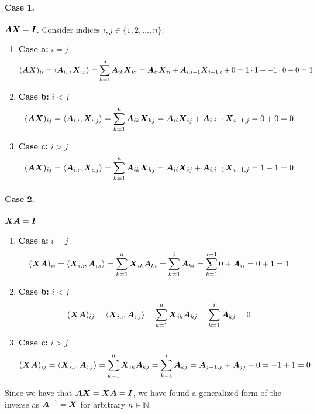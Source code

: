 \documentclass[]{exam}
\let\oldparagraph\paragraph
\renewcommand{\paragraph}[1]{\oldparagraph{#1}\mbox{}}
\begin{document}
\begin{questions}
\begin{enumerate}[label=\arabic*.]
		\paragraph{Case 1.} $\boldsymbol{A} \boldsymbol{X} = \boldsymbol{I}$. Consider indices $i, j \in \{1, 2, \ldots, n\}$:
		\begin{enumerate}[label=\alph*.]
			\item \textbf{Case a:} $i = j$
				\begin{gather*}
					(\boldsymbol{A} \boldsymbol{X})_{ii} = \langle \boldsymbol{A}_{i, :}, \boldsymbol{X}_{:, i} \rangle = \sum^n_{k = 1} \boldsymbol{A}_{ik} \boldsymbol{X}_{ki} = \boldsymbol{A}_{ii} \boldsymbol{X}_{ii} + \boldsymbol{A}_{i, i - 1} \boldsymbol{X}_{i - 1, i} + 0 = 1 \cdot 1 + -1 \cdot 0 + 0 = 1
				\end{gather*}
			\item \textbf{Case b:} $i < j$
				\begin{gather*}
					(\boldsymbol{A} \boldsymbol{X})_{ij} = \langle \boldsymbol{A}_{i, :}, \boldsymbol{X}_{:, j} \rangle = \sum^n_{k = 1} \boldsymbol{A}_{ik} \boldsymbol{X}_{kj} = \boldsymbol{A}_{ii} \boldsymbol{X}_{ij} + \boldsymbol{A}_{i,i - 1} \boldsymbol{X}_{i-1,j} = 0 + 0 = 0
				\end{gather*}
			\item \textbf{Case c:} $i > j$
				\begin{gather*}
					(\boldsymbol{A} \boldsymbol{X})_{ij} = \langle \boldsymbol{A}_{i, :}, \boldsymbol{X}_{:, j} \rangle = \sum^n_{k = 1} \boldsymbol{A}_{ik} \boldsymbol{X}_{kj} = \boldsymbol{A}_{ii} \boldsymbol{X}_{ij} + \boldsymbol{A}_{i,i - 1} \boldsymbol{X}_{i-1,j} = 1 - 1 = 0
				\end{gather*}
		\end{enumerate}
		\paragraph{Case 2.} $\boldsymbol{X} \boldsymbol{A} = \boldsymbol{I}$
		\begin{enumerate}[label=\alph*.]
			\item \textbf{Case a:} $i = j$
				\begin{gather*}
					(\boldsymbol{X} \boldsymbol{A})_{ii} = \langle \boldsymbol{X}_{i, :}, \boldsymbol{A}_{:, i} \rangle = \sum^n_{k = 1} \boldsymbol{X}_{ik} \boldsymbol{A}_{ki} = \sum^{i}_{k = 1} \boldsymbol{A}_{ki} = \sum^{i-1}_{k=1} 0 + \boldsymbol{A}_{ii} = 0 + 1 = 1
				\end{gather*}
			\item \textbf{Case b:} $i < j$
				\begin{gather*}
					(\boldsymbol{X} \boldsymbol{A})_{ij} = \langle \boldsymbol{X}_{i, :}, \boldsymbol{A}_{:, j} \rangle = \sum^n_{k = 1} \boldsymbol{X}_{ik} \boldsymbol{A}_{kj} = \sum^{i}_{k = 1} \boldsymbol{A}_{kj} = 0
				\end{gather*}
			\item \textbf{Case c:} $i > j$
				\begin{gather*}
					(\boldsymbol{X} \boldsymbol{A})_{ij} = \langle \boldsymbol{X}_{i, :}, \boldsymbol{A}_{:, j} \rangle = \sum^n_{k = 1} \boldsymbol{X}_{ik} \boldsymbol{A}_{kj} = \sum^{i}_{k = 1} \boldsymbol{A}_{kj} = \boldsymbol{A}_{j-1, j} + \boldsymbol{A}_{jj} + 0 = -1 + 1 = 0
				\end{gather*}
		\end{enumerate}
		Since we have that $\boldsymbol{A} \boldsymbol{X} = \boldsymbol{X} \boldsymbol{A} = \boldsymbol{I}$, we have found a generalized form of the inverse as $\boldsymbol{A}^{-1} = \boldsymbol{X}$ for arbitrary $n \in \mathbb{N}$.
\end{enumerate}

\end{questions}
\end{document}
